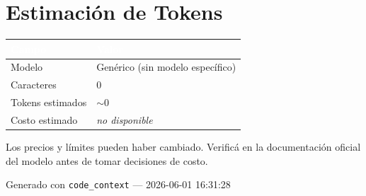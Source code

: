 \documentclass[12pt, a4paper]{report}
\begin{document}
\chapter{Estimación de Tokens}

\begin{center}
\begin{tabular}{ll}
  \toprule
  \rowcolor{tablehead}\textcolor{white}{\textbf{Campo}} & \textcolor{white}{\textbf{Valor}} \\
  \midrule
  Modelo & Genérico (sin modelo específico) \\
  Caracteres & 0 \\
  Tokens estimados & $\sim$0 \\
  Costo estimado & \textit{no disponible} \\
  \bottomrule
\end{tabular}
\end{center}

\begin{sectionbox}
Los precios y límites pueden haber cambiado. Verificá en la documentación oficial del modelo antes de tomar decisiones de costo.
\end{sectionbox}


\vfill
\begin{center}
  \textcolor{muted}{\small Generado con \texttt{code\_context} --- 2026-06-01 16:31:28}
\end{center}
\end{document}
